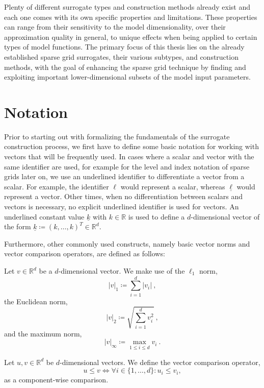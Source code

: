 \documentclass[
  a4paper,  %
  twoside,  %
  bibliography=totoc,
  headsepline,
  cleardoublepage=empty,
  parskip=half,
  draft=false
]{scrbook}
\begin{document}
Plenty of different surrogate types and construction methods already exist and each one comes with its own specific properties and limitations.
These properties can range from their sensitivity to the model dimensionality, over their approximation quality in general, to unique effects when being applied to certain types of model functions.
The primary focus of this thesis lies on the already established sparse grid surrogates, their various subtypes, and construction methods, with the goal of enhancing the sparse grid technique by finding and exploiting important lower-dimensional subsets of the model input parameters.

\newpage
\section{Notation}

Prior to starting out with formalizing the fundamentals of the surrogate construction process, we first have to define some basic notation for working with vectors that will be frequently used.
In cases where a scalar and vector with the same identifier are used, for example for the level and index notation of sparse grids later on, we use an underlined identifier to differentiate a vector from a scalar.
For example, the identifier $\ell$ would represent a scalar, whereas $\underline{\ell}$ would represent a vector.
Other times, when no differentiation between scalars and vectors is necessary, no explicit underlined identifier is used for vectors.
An underlined constant value $\underline{k}$ with $k \in \mathds{R}$ is used to define a $d$-dimensional vector of the form $\underline{k} \coloneqq (k, \dots, k)^T \in \mathds{R}^d$.

Furthermore, other commonly used constructs, namely basic vector norms and vector comparison operators, are defined as follows:
\begin{definition}
Let $v \in \mathds{R}^d$ be a $d$-dimensional vector.
We make use of the $\ell_1$ norm,
\begin{equation}
|v|_1 \coloneqq \sum_{i=1}^d |v_i| ~,
\end{equation}
the Euclidean norm,
\begin{equation}
|v|_2 \coloneqq \sqrt{\sum_{i=1}^d v_i^2} ~,
\end{equation}
and the maximum norm,
\begin{equation}
|v|_\infty \coloneqq \max_{1 \leq i \leq d} v_i ~.
\end{equation}
\end{definition}
%
\begin{definition}
Let $u, v \in \mathds{R}^d$ be $d$-dimensional vectors.
We define the vector comparison operator,
\begin{equation}
u \leq v \Leftrightarrow \forall i \in \{1,\dots,d\} \colon u_i \leq v_i,
\end{equation}
as a component-wise comparison.
\end{definition}
\end{document}

